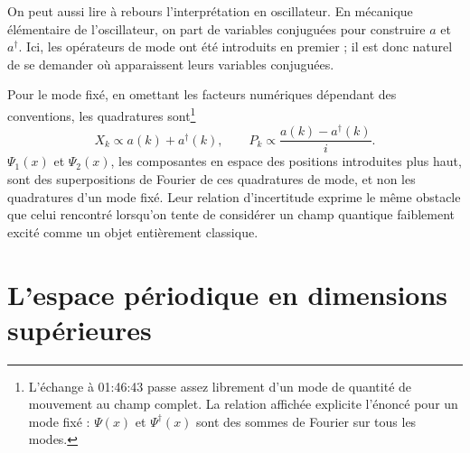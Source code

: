 On peut aussi lire à rebours l’interprétation en oscillateur. En mécanique élémentaire de l’oscillateur, on part de variables conjuguées pour construire \(a\) et \(a^\dagger\). Ici, les opérateurs de mode ont été introduits en premier ; il est donc naturel de se demander où apparaissent leurs variables conjuguées.

\begin{classroomqa}\end{classroomqa}

Pour le mode fixé, en omettant les facteurs numériques dépendant des conventions, les quadratures sont\footnote{L’échange à 01:46:43 passe assez librement d’un mode de quantité de mouvement au champ complet. La relation affichée explicite l’énoncé pour un mode fixé : \(\Psi(x)\) et \(\Psi^\dagger(x)\) sont des sommes de Fourier sur tous les modes.}\begin{equation}
X_k\propto a(k)+a^\dagger(k),
\qquad
P_k\propto \frac{a(k)-a^\dagger(k)}{i}.
\end{equation}
\(\Psi_1(x)\) et \(\Psi_2(x)\), les composantes en espace des positions introduites plus haut, sont des superpositions de Fourier de ces quadratures de mode, et non les quadratures d’un mode fixé. Leur relation d’incertitude exprime le même obstacle que celui rencontré lorsqu’on tente de considérer un champ quantique faiblement excité comme un objet entièrement classique.

\section{L’espace périodique en dimensions supérieures}

\begin{classroomqa}\end{classroomqa}


